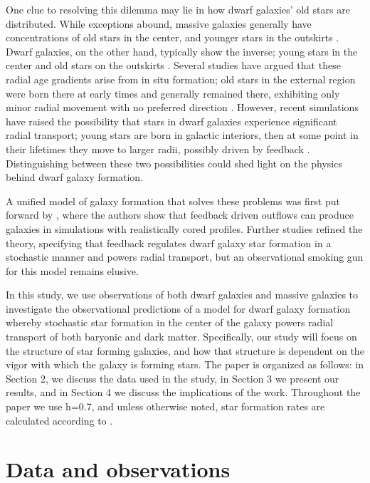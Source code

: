\documentclass[iop]{emulateapj}
\begin{document}
One clue to resolving this dilemma may lie in how dwarf galaxies' old stars are distributed. While exceptions abound, massive galaxies generally have concentrations of old stars in the center, and younger stars in the outskirts \citep{dejong96,Bakos08}. Dwarf galaxies, on the other hand, typically show the inverse; young stars in the center and old stars on the outskirts \citep{Hidalgo09,Hidalgo13}. Several studies have argued that these radial age gradients arise from in situ formation; old stars in the external region were born there at early times and generally remained there, exhibiting only minor radial movement with no preferred direction \citep{Stinson09,Schroyen13}. However, recent simulations have raised the possibility that stars in dwarf galaxies experience significant radial transport; young stars are born in galactic interiors, then at some point in their lifetimes they move to larger radii, possibly driven by feedback \citep{Gonz16,EB17}. Distinguishing between these two possibilities could shed light on the physics behind dwarf galaxy formation.

A unified model of galaxy formation that solves these problems was first put forward by \cite{Navarro96}, where the authors show that feedback driven outflows can produce galaxies in simulations with realistically cored profiles. Further studies \citep{Governato10,Governato12,Maxwell12,DC14,Pontzen14,Chan15,EB17} refined the theory, specifying that feedback regulates dwarf galaxy star formation in a stochastic manner and powers radial transport, but an observational smoking gun for this model remains elusive. 

In this study, we use observations of both dwarf galaxies and massive galaxies to investigate the observational predictions of a model for dwarf galaxy formation whereby stochastic star formation in the center of the galaxy powers radial transport of both baryonic and dark matter. Specifically, our study will focus on the structure of star forming galaxies, and how that structure is dependent on the vigor with which the galaxy is forming stars. The paper is organized as follows: in Section 2, we discuss the data used in the study, in Section 3 we present our results, and in Section 4 we discuss the implications of the work. Throughout the paper we use h=0.7, and unless otherwise noted, star formation rates are calculated according to \cite{KS98}. 

\section{Data and observations}
\label{sec:obs}
\end{document}

